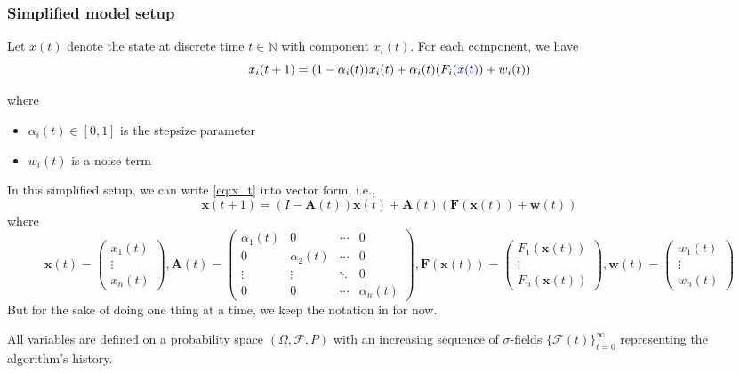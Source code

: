 \subsubsection{Simplified model setup}
Let $x(t)$ denote the state at discrete time $t\in\mathbb{N}$ with component $x_i(t)$. For each component, we have
\begin{equation}
    x_i(t+1) = (1-\alpha_i(t))x_i(t) + \alpha_i(t)(F_i(\textcolor{blue}{x(t)}) + w_i(t)) 
\end{equation}\label{eq:x_t}

where
\begin{itemize}
    \item $\alpha_i(t) \in [0,1]$ is the stepsize parameter
    \item $w_i(t)$ is a noise term
\end{itemize}
\begin{remark}
    In this simplified setup, we can write \autoref{eq:x_t} into vector form, i.e.,
    $$
    \mathbf{x}(t+1) =(I-\mathbf{A}(t)) \mathbf{x}(t) + \mathbf{A}(t)(\mathbf{F}(\mathbf{x}(t)) +\mathbf{w}(t))
    $$
    where
    $$
    \mathbf{x}(t) = \begin{pmatrix}
        x_1(t)\\
        \vdots\\
        x_n(t)
    \end{pmatrix},\mathbf{A}(t) = \begin{pmatrix}
        \alpha_1(t) & 0& \cdots & 0\\
        0& \alpha_2(t) & \cdots & 0\\
        \vdots & \vdots & \ddots & 0\\
        0 &0 &\cdots & \alpha_n(t)
    \end{pmatrix},\mathbf{F}(\mathbf{x}(t)) = \begin{pmatrix}
        F_1(\mathbf{x}(t))\\
        \vdots\\
        F_n(\mathbf{x}(t))
    \end{pmatrix},\mathbf{w}(t) = \begin{pmatrix}
        w_1(t)\\
        \vdots\\
        w_n(t)
    \end{pmatrix}
    $$
    But for the sake of doing one thing at a time, we keep the notation in \cite{tsitsiklis1994asynchronous} for now.
\end{remark}
All variables are defined on a probability space $(\Omega, \mathcal{F}, P)$ with an increasing sequence of $\sigma$-fields $\{\mathcal{F}(t)\}_{t=0}^{\infty}$ representing the algorithm's history. \\
